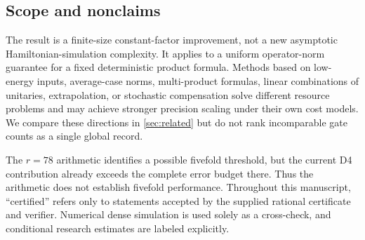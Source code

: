 \subsection{Scope and nonclaims}

The result is a finite-size constant-factor improvement, not a new asymptotic
Hamiltonian-simulation complexity.  It applies to a uniform operator-norm
guarantee for a fixed deterministic product formula.  Methods based on low-
energy inputs, average-case norms, multi-product formulas, linear combinations
of unitaries, extrapolation, or stochastic compensation solve different
resource problems and may achieve stronger precision scaling under their own
cost models.  We compare these directions in \cref{sec:related} but do not
rank incomparable gate counts as a single global record.

The $r=78$ arithmetic identifies a possible fivefold threshold, but the
current D4 contribution already exceeds the complete error budget there.
Thus the arithmetic does not establish fivefold performance.  Throughout this manuscript,
``certified'' refers only to statements accepted by the supplied rational
certificate and verifier.  Numerical dense simulation is used solely as a
cross-check, and conditional research estimates are labeled explicitly.
